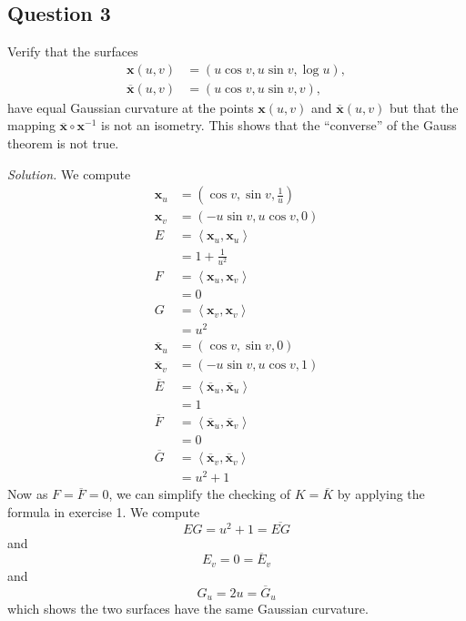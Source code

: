 \documentclass[12pt]{article}
\begin{document}
\subsection*{Question 3}

Verify that the surfaces
\begin{align*}
    \mathbf{x}(u,v) &= (u\cos v, u\sin v, \log u), \\
    \overline{\mathbf{x}}(u,v) &= (u\cos v, u\sin v, v),
\end{align*}
have equal Gaussian curvature at the points \(\mathbf{x}(u,v)\) and \(\overline{\mathbf{x}}(u,v)\)
but that the mapping \(\overline{\mathbf{x}} \circ \mathbf{x}^{-1}\) is not an isometry.
This shows that the ``converse'' of the Gauss theorem is not true.

\emph{Solution.}
We compute
\begin{align*}
    \mathbf{x}_u &= \left( \cos v, \sin v, \frac1u \right) \\
    \mathbf{x}_v &= \left( -u \sin v, u\cos v, 0 \right) \\
    E &= \left\langle \mathbf{x}_u, \mathbf{x}_u \right\rangle \\
      &= 1 + \frac1{u^2} \\
    F &= \left\langle \mathbf{x}_u, \mathbf{x}_v \right\rangle \\
      &= 0 \\
    G &= \left\langle \mathbf{x}_v, \mathbf{x}_v \right\rangle \\
      &= u^2 \\
    \overline{\mathbf{x}}_u &= \left( \cos v, \sin v, 0 \right) \\
    \overline{\mathbf{x}}_v &= \left( -u \sin v, u\cos v, 1 \right) \\
    \overline{E} &= \left\langle \overline{\mathbf{x}}_u, \overline{\mathbf{x}}_u \right\rangle \\
                 &= 1 \\
    \overline{F} &= \left\langle \overline{\mathbf{x}}_u, \overline{\mathbf{x}}_v \right\rangle \\
                 &= 0 \\
    \overline{G} &= \left\langle \overline{\mathbf{x}}_v, \overline{\mathbf{x}}_v \right\rangle \\
                 &= u^2 + 1
\end{align*}
Now as \(F = \overline{F} = 0\), we can simplify the checking of \(K = \overline{K}\) by applying the formula in exercise 1.
We compute
\[ EG = u^2 + 1 = \overline{EG} \]
and
\[ E_v = 0 = \overline{E}_v \]
and
\[ G_u = 2u = \overline{G}_u \]
which shows the two surfaces have the same Gaussian curvature.
\end{document}

